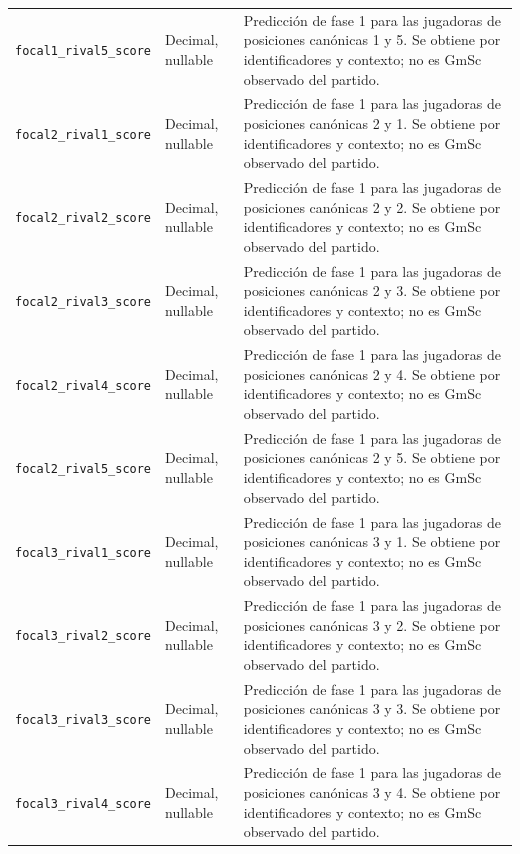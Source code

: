 \begin{longtable}{@{}>{\raggedright\arraybackslash}p{5.0cm}>{\raggedright\arraybackslash}p{1.9cm}>{\raggedright\arraybackslash}p{7.7cm}@{}}
\texttt{focal1\_\allowbreak rival5\_\allowbreak score} & Decimal, nullable & Predicción de fase 1 para las jugadoras de posiciones canónicas 1 y 5. Se obtiene por identificadores y contexto; no es GmSc observado del partido.\\
\texttt{focal2\_\allowbreak rival1\_\allowbreak score} & Decimal, nullable & Predicción de fase 1 para las jugadoras de posiciones canónicas 2 y 1. Se obtiene por identificadores y contexto; no es GmSc observado del partido.\\
\texttt{focal2\_\allowbreak rival2\_\allowbreak score} & Decimal, nullable & Predicción de fase 1 para las jugadoras de posiciones canónicas 2 y 2. Se obtiene por identificadores y contexto; no es GmSc observado del partido.\\
\texttt{focal2\_\allowbreak rival3\_\allowbreak score} & Decimal, nullable & Predicción de fase 1 para las jugadoras de posiciones canónicas 2 y 3. Se obtiene por identificadores y contexto; no es GmSc observado del partido.\\
\texttt{focal2\_\allowbreak rival4\_\allowbreak score} & Decimal, nullable & Predicción de fase 1 para las jugadoras de posiciones canónicas 2 y 4. Se obtiene por identificadores y contexto; no es GmSc observado del partido.\\
\texttt{focal2\_\allowbreak rival5\_\allowbreak score} & Decimal, nullable & Predicción de fase 1 para las jugadoras de posiciones canónicas 2 y 5. Se obtiene por identificadores y contexto; no es GmSc observado del partido.\\
\texttt{focal3\_\allowbreak rival1\_\allowbreak score} & Decimal, nullable & Predicción de fase 1 para las jugadoras de posiciones canónicas 3 y 1. Se obtiene por identificadores y contexto; no es GmSc observado del partido.\\
\texttt{focal3\_\allowbreak rival2\_\allowbreak score} & Decimal, nullable & Predicción de fase 1 para las jugadoras de posiciones canónicas 3 y 2. Se obtiene por identificadores y contexto; no es GmSc observado del partido.\\
\texttt{focal3\_\allowbreak rival3\_\allowbreak score} & Decimal, nullable & Predicción de fase 1 para las jugadoras de posiciones canónicas 3 y 3. Se obtiene por identificadores y contexto; no es GmSc observado del partido.\\
\texttt{focal3\_\allowbreak rival4\_\allowbreak score} & Decimal, nullable & Predicción de fase 1 para las jugadoras de posiciones canónicas 3 y 4. Se obtiene por identificadores y contexto; no es GmSc observado del partido.\\

\end{longtable}
